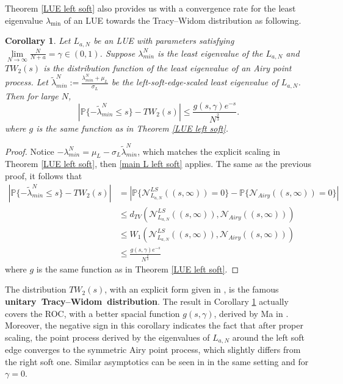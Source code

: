 \documentclass[11pt]{article}
\newtheorem{corollary}[theorem]{Corollary}
\numberwithin{equation}{section}%
\numberwithin{theorem}{section}
\begin{document}
Theorem \ref{LUE left soft} also provides us with a convergence rate for the least eigenvalue $\lambda_{\min}$ of an LUE towards the Tracy--Widom distribution as following. 
 \begin{corollary}\label{smallessoft}
    Let $L_{a,N}$ be an LUE with parameters satisfying $\lim\limits_{N\rightarrow\infty}\frac{N}{N+a}=\gamma\in(0,1)$. Suppose $\lambda_{min}^N$ is the least eigenvalue of the $L_{a,N}$ and $TW_2(s)$ is the distribution function of the least eigenvalue of an Airy point process. Let $\tilde{\lambda}^N_{min}:=\frac{\lambda_{min}^N+\mu_L}{\sigma_L}$ be the left-soft-edge-scaled least eigenvalue of $L_{a,N}$. Then for large $N$,
    \begin{equation*}
        |\mathbb{P}\{-\tilde{\lambda}_{min}^N\le s\}-TW_2(s)|\le \frac{g(s,\gamma)e^{-s}}{N^{\frac{2}{3}}}.
    \end{equation*}
    where $g$ is the same function as in Theorem \ref{LUE left soft}.
\end{corollary}
\begin{proof}
    Notice $-\lambda_{min}^N=\mu_L-\sigma_L\tilde{\lambda}_{min}^N$, which matches the explicit scaling in Theorem \ref{LUE left soft}, then \eqref{main L left soft} applies. The same as the previous proof, it follows that
   \begin{equation*}
\begin{split}
     |\mathbb{P}\{-\tilde{\lambda}_{min}^N\le s\}-TW_2(s)|&=|\mathbb{P}\{\mathcal{N}_{L_{a,N}}^{LS}((s,\infty))=0\}-\mathbb{P}\{\mathcal{N}_{Airy}((s,\infty))=0\}|
     \\&\le d_{TV}(\mathcal{N}_{L_{a,N}}^{LS}((s,\infty)),\mathcal{N}_{Airy}((s,\infty)))
     \\&\le W_1(\mathcal{N}_{L_{a,N}}^{LS}((s,\infty)),\mathcal{N}_{Airy}((s,\infty)))\\&\le\frac{g(s,\gamma)e^{-s}}{N^\frac{2}{3}}
\end{split}
\end{equation*}
where $g$ is the same function as in Theorem \ref{LUE left soft}.
\end{proof}
The distribution $TW_2(s)$, with an explicit form given in \cite{tracy1994level}, is the famous \textbf{unitary~Tracy--Widom~distribution}. The result in Corollary \ref{smallessoft} actually covers the ROC, with a better spacial function $g(s,\gamma)$, derived by Ma in \cite[Theorem $2$]{ma_accuracy_2012}. Moreover, the negative sign in this corollary indicates the fact that after proper scaling, the point process derived by the eigenvalues of $L_{a,N}$ around the left soft edge converges to the symmetric Airy point process, which slightly differs from the right soft one. Similar asymptotics can be seen in \cite{ma_accuracy_2012} in the same setting and \cite{DePaul-asyp} for $\gamma=0$.
\end{document}
